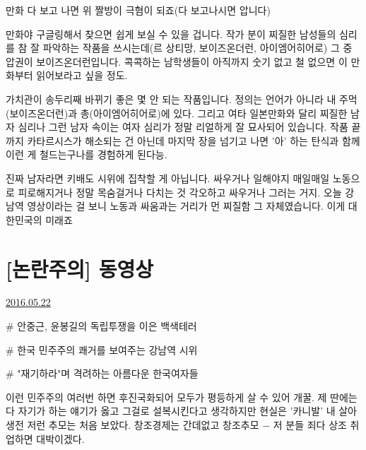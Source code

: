 \vspace{5mm}

만화 다 보고 나면 위 짤방이 극혐이 되죠(다 보고나시면 압니다)
\vspace{5mm}

만화야 구글링해서 찾으면 쉽게 보실 수 있을 겁니다.
작가 분이 찌질한 남성들의 심리를 참 잘 파악하는 작품을 쓰시는데(르 상티망, 보이즈온더런, 아이엠어히어로)
그 중 압권이 보이즈온더런입니다.
콕콕하는 남학생들이 아직까지 숫기 없고 철 없으면 이 만화부터 읽어보라고 싶을 정도.
\vspace{5mm}

가치관이 송두리째 바뀌기 좋은 몇 안 되는 작품입니다.
정의는 언어가 아니라 내 주먹(보이즈온더런)과 총(아이엠어히어로)에 있다.
그리고 여타 일본만화와 달리 찌질한 남자 심리나 그런 남자 속이는 여자 심리가 정말 리얼하게 잘 묘사되어 있습니다.
작품 끝까지 카타르시스가 해소되는 건 아닌데 마지막 장을 넘기고 나면 '아' 하는 탄식과 함께 이런 게 철드는구나를 경험하게 된다능.
\vspace{5mm}

진짜 남자라면 키배도 시위에 집착할 게 아닙니다.
싸우거나 일해야지
매일매일 노동으로 피로해지거나 정말 목숨걸거나 다치는 것 각오하고 싸우거나 그러는 거지.
오늘 강남역 영상이라는 걸 보니 노동과 싸움과는 거리가 먼 찌질함 그 자체였습니다. 이게 대한민국의 미래죠
\vspace{5mm}






\section{[논란주의] 동영상}
\href{https://www.kockoc.com/Apoc/787211}{2016.05.22}

\vspace{5mm}

$\#$ 안중근, 윤봉길의 독립투쟁을 이은 백색테러
\vspace{5mm}

$\#$ 한국 민주주의 쾌거를 보여주는 강남역 시위
\vspace{5mm}

$\#$ "재기하라"며 격려하는 아름다운 한국여자들
\vspace{5mm}

이런 민주주의 여러번 하면 후진국화되어 모두가 평등하게 살 수 있어 개꿀.
제 딴에는 다 자기가 하는 얘기가 옳고 그걸로 설복시킨다고 생각하지만 현실은 '카니발'
내 살아 생전 저런 추모는 처음 보았다. 창조경제는 간데없고 창조추모 $-$ 저 분들 죄다 상조 취업하면 대박이겠다.
\vspace{5mm}

